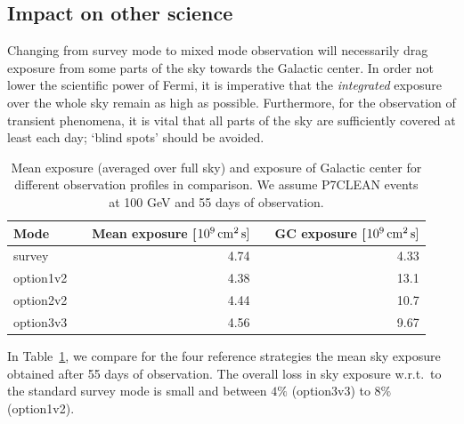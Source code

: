 \documentclass[aps,prd,superscriptaddress,nofootinbib,fixlfloat, 12pt]{revtex4-1}
\begin{document}
\subsection{Impact on other science}
Changing from survey mode to mixed mode observation will necessarily drag
exposure from some parts of the sky towards the Galactic center. In order not
lower the scientific power of Fermi, it is imperative that the
\emph{integrated} exposure over the whole sky remain as high as
possible. Furthermore, for the observation of transient phenomena, it is vital
that all parts of the sky are sufficiently covered at least each day; `blind
spots' should be avoided.

\begin{table}[t]
  \begin{tabular}{lcrcr}
    \hline
    Mode && Mean exposure [$10^9\rm\,cm^2\,s]$ && GC exposure
    [$10^9\rm\,cm^2\,s]$ \\\hline
    survey && 4.74 && 4.33 \\
    option1v2 && 4.38 && 13.1 \\
    option2v2 && 4.44 && 10.7 \\
    option3v3 && 4.56 && 9.67  \\
    \hline
  \end{tabular}
  \caption{Mean exposure (averaged over full
  sky) and exposure of Galactic center for different observation profiles in comparison.
  We assume P7CLEAN events at 100 GeV and 55 days of observation.}
  \label{tab:exposures}
\end{table}

In Table~\ref{tab:exposures}, we compare for the four reference 
strategies the mean sky exposure obtained after 55 days of observation. The
overall loss in sky exposure w.r.t.~to the standard survey mode is small and
between $4\%$ (option3v3) to $8\%$ (option1v2).
\end{document}
